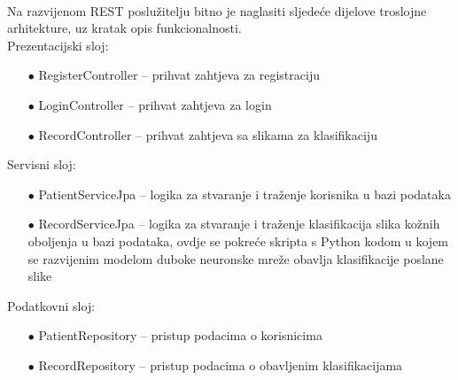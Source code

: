\documentclass[times, utf8, zavrsni]{fer}
\begin{document}
%
\\
Na razvijenom REST poslužitelju bitno je naglasiti sljedeće dijelove troslojne arhitekture, uz kratak opis funkcionalnosti.\\
%
Prezentacijski sloj:
\begin{itemize}
\item[$\bullet$] RegisterController -- prihvat zahtjeva za registraciju
\item[$\bullet$] LoginController -- prihvat zahtjeva za login
\item[$\bullet$] RecordController -- prihvat zahtjeva sa slikama za klasifikaciju
\end{itemize}
%
Servisni sloj:
\begin{itemize}
\item[$\bullet$] PatientServiceJpa -- logika za stvaranje i traženje korisnika u bazi podataka
\item[$\bullet$] RecordServiceJpa -- logika za stvaranje i traženje klasifikacija slika kožnih oboljenja u bazi podataka, ovdje se pokreće skripta s Python kodom u kojem se razvijenim modelom duboke neuronske mreže obavlja klasifikacije poslane slike
\end{itemize}
%
Podatkovni sloj:
\begin{itemize}
\item[$\bullet$] PatientRepository -- pristup podacima o korisnicima
\item[$\bullet$] RecordRepository -- pristup podacima o obavljenim klasifikacijama
\end{itemize}
\end{document}
